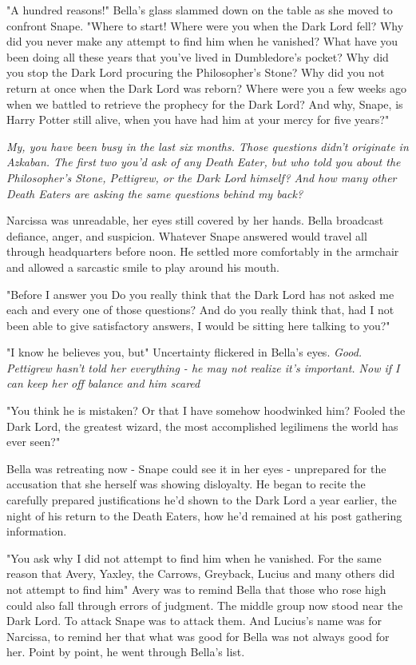 "A hundred reasons!" Bella's glass slammed down on the table as she moved to confront Snape. "Where to start! Where were you when the Dark Lord fell? Why did you never make any attempt to find him when he vanished? What have you been doing all these years that you've lived in Dumbledore's pocket? Why did you stop the Dark Lord procuring the Philosopher's Stone? Why did you not return at once when the Dark Lord was reborn? Where were you a few weeks ago when we battled to retrieve the prophecy for the Dark Lord? And why, Snape, is Harry Potter still alive, when you have had him at your mercy for five years?"

\emph{My, you have been busy in the last six months. Those questions didn't originate in Azkaban. The first two you'd ask of any Death Eater, but who told you about the Philosopher's Stone, Pettigrew, or the Dark Lord himself? And how many other Death Eaters are asking the same questions behind my back?}

Narcissa was unreadable, her eyes still covered by her hands. Bella broadcast defiance, anger, and suspicion. Whatever Snape answered would travel all through headquarters before noon. He settled more comfortably in the armchair and allowed a sarcastic smile to play around his mouth.

"Before I answer you{\el} Do you really think that the Dark Lord has not asked me each and every one of those questions? And do you really think that, had I not been able to give satisfactory answers, I would be sitting here talking to you?"

"I know he believes you, but{\el}" Uncertainty flickered in Bella's eyes. \emph{Good. Pettigrew hasn't told her everything - he may not realize it's important. Now if I can keep her off balance and him scared{\el}}

"You think he is mistaken? Or that I have somehow hoodwinked him? Fooled the Dark Lord, the greatest wizard, the most accomplished legilimens the world has ever seen?"

Bella was retreating now - Snape could see it in her eyes - unprepared for the accusation that she herself was showing disloyalty. He began to recite the carefully prepared justifications he'd shown to the Dark Lord a year earlier, the night of his return to the Death Eaters, how he'd remained at his post gathering information.

"You ask why I did not attempt to find him when he vanished. For the same reason that Avery, Yaxley, the Carrows, Greyback, Lucius and many others did not attempt to find him{\el}" Avery was to remind Bella that those who rose high could also fall through errors of judgment. The middle group now stood near the Dark Lord. To attack Snape was to attack them. And Lucius's name was for Narcissa, to remind her that what was good for Bella was not always good for her. Point by point, he went through Bella's list.

